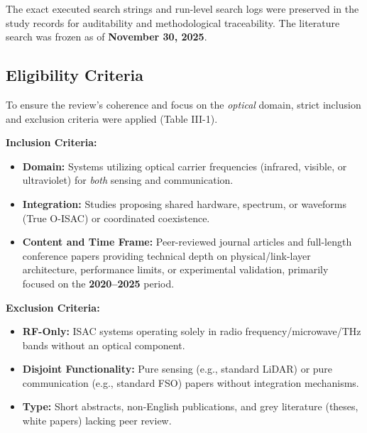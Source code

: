 The exact executed search strings and run-level search logs were preserved in the study records for auditability and methodological traceability. The literature search was frozen as of \textbf{November 30, 2025}.

\subsection{Eligibility Criteria}
To ensure the review's coherence and focus on the \textit{optical} domain, strict inclusion and exclusion criteria were applied (Table III-1).

\textbf{Inclusion Criteria:}
\begin{itemize}
    \item \textbf{Domain:} Systems utilizing optical carrier frequencies (infrared, visible, or ultraviolet) for \textit{both} sensing and communication.
    \item \textbf{Integration:} Studies proposing shared hardware, spectrum, or waveforms (True O-ISAC) or coordinated coexistence.
    \item \textbf{Content and Time Frame:} Peer-reviewed journal articles and full-length conference papers providing technical depth on physical/link-layer architecture, performance limits, or experimental validation, primarily focused on the \textbf{2020--2025} period.
\end{itemize}

\textbf{Exclusion Criteria:}
\begin{itemize}
    \item \textbf{RF-Only:} ISAC systems operating solely in radio frequency/microwave/THz bands without an optical component.
    \item \textbf{Disjoint Functionality:} Pure sensing (e.g., standard LiDAR) or pure communication (e.g., standard FSO) papers without integration mechanisms.
    \item \textbf{Type:} Short abstracts, non-English publications, and grey literature (theses, white papers) lacking peer review.
\end{itemize}

